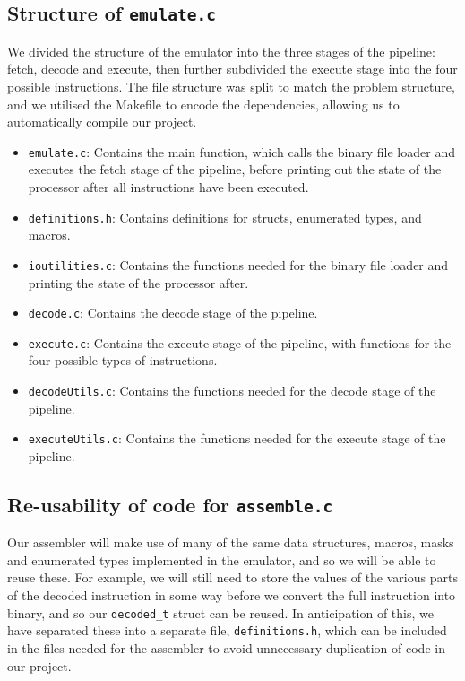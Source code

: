 \documentclass[11pt]{article}
\begin{document}
\subsection{Structure of \texttt{emulate.c}}

We divided the structure of the emulator into the three stages of the pipeline: fetch, decode and execute, then further subdivided the execute stage into the four possible instructions. The file structure was split to match the problem structure, and we utilised the Makefile to encode the dependencies, allowing us to automatically compile our project.

\begin{itemize}

\item \texttt{emulate.c}: Contains the main function, which calls the binary file loader and executes the fetch stage of the pipeline, before printing out the state of the processor after all instructions have been executed.
\item \texttt{definitions.h}: Contains definitions for structs, enumerated types, and macros.
\item \texttt{ioutilities.c}: Contains the functions needed for the binary file loader and printing the state of the processor after.
\item \texttt{decode.c}: Contains the decode stage of the pipeline.
\item \texttt{execute.c}: Contains the execute stage of the pipeline, with functions for the four possible types of instructions.
\item \texttt{decodeUtils.c}: Contains the functions needed for the decode stage of the pipeline.
\item \texttt{executeUtils.c}: Contains the functions needed for the execute stage of the pipeline.

\end{itemize}

\subsection{Re-usability of code for \texttt{assemble.c}}

Our assembler will make use of many of the same data structures, macros, masks and enumerated types implemented in the emulator, and so we will be able to reuse these. For example, we will still need to store the values of the various parts of the decoded instruction in some way before we convert the full instruction into binary, and so our \texttt{decoded\_t} struct can be reused. In anticipation of this, we have separated these into a separate file, \texttt{definitions.h}, which can be included in the files needed for the assembler to avoid unnecessary duplication of code in our project.
\end{document}
